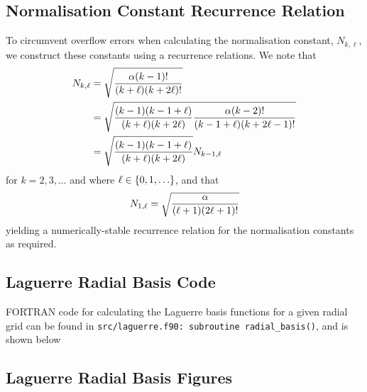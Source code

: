 \documentclass[]{article}
\begin{document}
\subsection{Normalisation Constant Recurrence Relation}
\label{sec:norm-const}

To circumvent overflow errors when calculating the normalisation constant,
$N_{k, \ell}$, we construct these constants using a recurrence relations.
We note that
\begin{alignat*}{2}
  N_{k, \ell}
  {}={}
  &
  \sqrt
  {
    \dfrac
    {
      \alpha
      (k - 1)!
    }
    {
      (k + \ell)
      (k + 2\ell)!
    }
  }
  \\
  {}={}
  &
  \sqrt
  {
    \dfrac
    {
      (k - 1)
      (k - 1 + \ell)
    }
    {
      (k + \ell)
      (k + 2\ell)
    }
    \dfrac
    {
      \alpha
      (k - 2)!
    }
    {
      (k - 1 + \ell)
      (k + 2\ell - 1)!
    }
  }
  \\
  {}={}
  &
  \sqrt
  {
    \dfrac
    {
      (k - 1)
      (k - 1 + \ell)
    }
    {
      (k + \ell)
      (k + 2\ell)
    }
  }
  N_{k - 1, \ell}
\end{alignat*}
for $k = 2, 3, \dotsc$ and where $\ell \in \lrset{0, 1, \dotsc}$, and that
\begin{equation*}
  N_{1, \ell}
  =
  \sqrt
  {
    \dfrac
    {
      \alpha
    }
    {
      (\ell + 1)
      (2\ell + 1)!
    }
  }
\end{equation*}
yielding a numerically-stable recurrence relation for the normalisation
constants as required.

\subsection{Laguerre Radial Basis Code}
\label{sec:lagu-radi-basis-code}

FORTRAN code for calculating the Laguerre basis functions for a given radial
grid can be found in
\lstinline[style=ff]{src/laguerre.f90: }\lstinline{subroutine radial_basis()},
and is shown below




\subsection{Laguerre Radial Basis Figures}
\label{sec:lagu-radi-basis-figs}
\end{document}
